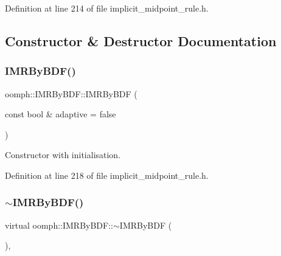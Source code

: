 Definition at line 214 of file implicit\+\_\+midpoint\+\_\+rule.\+h.



\subsection{Constructor \& Destructor Documentation}
\mbox{\label{classoomph_1_1IMRByBDF_a9b39aef878c283d7e7c5ad23ac7c8213}} 
\subsubsection{\texorpdfstring{I\+M\+R\+By\+B\+D\+F()}{IMRByBDF()}\hspace{0.1cm}{\footnotesize\ttfamily [1/2]}}
{\footnotesize\ttfamily oomph\+::\+I\+M\+R\+By\+B\+D\+F\+::\+I\+M\+R\+By\+B\+DF (\begin{DoxyParamCaption}\item[{const bool \&}]{adaptive = {\ttfamily false} }\end{DoxyParamCaption})\hspace{0.3cm}{\ttfamily [inline]}}



Constructor with initialisation. 



Definition at line 218 of file implicit\+\_\+midpoint\+\_\+rule.\+h.

\mbox{\label{classoomph_1_1IMRByBDF_aaa70e7e8090f3e454bc392e733b3185a}} 
\subsubsection{\texorpdfstring{$\sim$\+I\+M\+R\+By\+B\+D\+F()}{~IMRByBDF()}}
{\footnotesize\ttfamily virtual oomph\+::\+I\+M\+R\+By\+B\+D\+F\+::$\sim$\+I\+M\+R\+By\+B\+DF (\begin{DoxyParamCaption}{ }\end{DoxyParamCaption})\hspace{0.3cm}{\ttfamily [inline]}, {\ttfamily [virtual]}}



